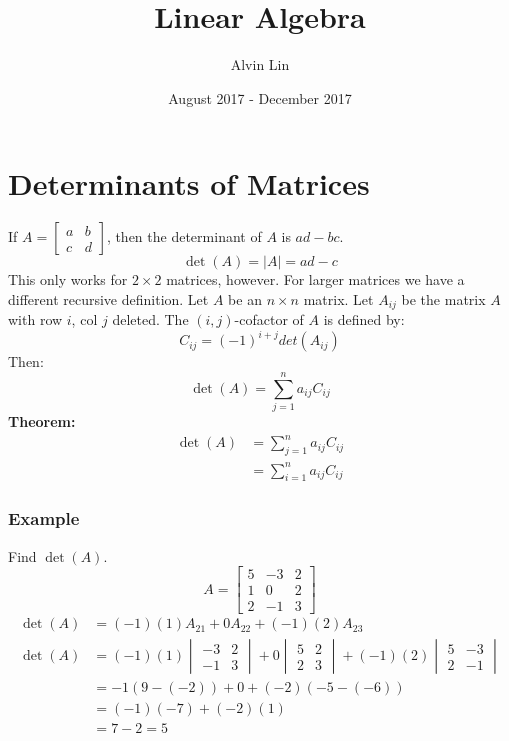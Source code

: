 \documentclass[letterpaper, 12pt]{math}
\title{Linear Algebra}
\author{Alvin Lin}
\date{August 2017 - December 2017}
\begin{document}
\maketitle

\section*{Determinants of Matrices}
If \( A = \begin{bmatrix}a & b \\ c & d\end{bmatrix} \), then the determinant
of \( A \) is \( ad-bc \).
\[ \det(A) = |A| = ad-c \]
This only works for \( 2\times2 \) matrices, however. For larger matrices we
have a different recursive definition. Let \( A \) be an \( n\times n \)
matrix. Let \( A_{ij} \) be the matrix \( A \) with row \( i \), col \( j \)
deleted. The \( (i,j) \)-cofactor of \( A \) is defined by:
\[ C_{ij} = (-1)^{i+j}det(A_{ij}) \]
Then:
\[ \det(A) = \sum_{j=1}^{n}a_{ij}C_{ij} \]
\textbf{Theorem:}
\begin{align*}
  \det(A) &= \sum_{j=1}^{n}a_{ij}C_{ij} \\
  &= \sum_{i=1}^{n}a_{ij}C_{ij}
\end{align*}

\subsubsection*{Example}
Find \( \det(A) \).
\[ A = \begin{bmatrix}5 & -3 & 2 \\ 1 & 0 & 2 \\ 2 & -1 & 3\end{bmatrix} \]
\begin{align*}
  \det(A) &= (-1)(1)A_{21}+0A_{22}+(-1)(2)A_{23} \\
  \det(A) &= (-1)(1)\begin{vmatrix}-3 & 2 \\ -1 & 3\end{vmatrix}+
    0\begin{vmatrix}5 & 2 \\ 2 & 3\end{vmatrix}+
    (-1)(2)\begin{vmatrix}5 & -3 \\ 2 & -1\end{vmatrix} \\
  &= -1(9-(-2))+0+(-2)(-5-(-6)) \\
  &= (-1)(-7)+(-2)(1) \\
  &= 7-2 = 5
\end{align*}
\end{document}
